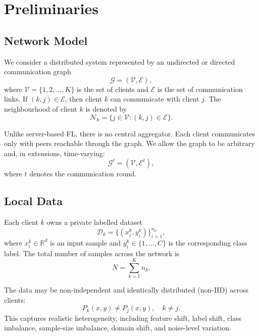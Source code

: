 \documentclass[conference]{IEEEtran}
\begin{document}
\section{Preliminaries}
\label{sec:preliminaries}

\subsection{Network Model}
\label{subsec:network-model}

We consider a distributed system represented by an undirected or directed communication graph
\begin{equation}
    \mathcal{G} = (\mathcal{V}, \mathcal{E}),
    \label{eq:auto-001}
\end{equation}
where \(\mathcal{V}=\{1,2,\dots,K\}\) is the set of clients and \(\mathcal{E}\) is the set of communication links. If \((k,j)\in\mathcal{E}\), then client \(k\) can communicate with client \(j\). The neighbourhood of client \(k\) is denoted by
\begin{equation}
    \mathcal{N}_k = \{j \in \mathcal{V}: (k,j)\in\mathcal{E}\}.
    \label{eq:auto-002}
\end{equation}

Unlike server-based FL, there is no central aggregator. Each client communicates only with peers reachable through the graph. We allow the graph to be arbitrary and, in extensions, time-varying:
\begin{equation}
    \mathcal{G}^t = (\mathcal{V}, \mathcal{E}^t),
    \label{eq:auto-003}
\end{equation}
where \(t\) denotes the communication round.

\subsection{Local Data}
\label{subsec:local-data}

Each client \(k\) owns a private labelled dataset
\begin{equation}
    \mathcal{D}_k = \{(x_i^k,y_i^k)\}_{i=1}^{n_k},
    \label{eq:auto-004}
\end{equation}
where \(x_i^k \in \mathbb{R}^{d}\) is an input sample and \(y_i^k \in \{1,\dots,C\}\) is the corresponding class label. The total number of samples across the network is
\begin{equation}
    N = \sum_{k=1}^{K} n_k.
    \label{eq:auto-005}
\end{equation}

The data may be non-independent and identically distributed (non-IID) across clients:
\begin{equation}
    P_k(x,y) \neq P_j(x,y), \quad k\neq j.
    \label{eq:auto-006}
\end{equation}
This captures realistic heterogeneity, including feature shift, label shift, class imbalance, sample-size imbalance, domain shift, and noise-level variation.
\end{document}
